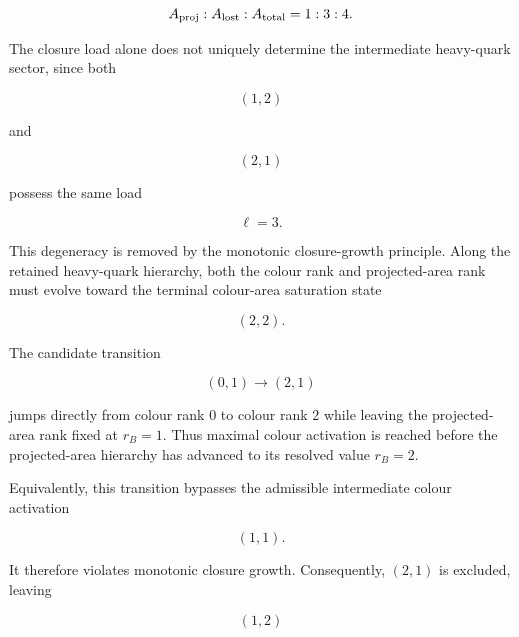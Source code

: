 \documentclass[11pt]{article}
\theoremstyle{definition}
\theoremstyle{remark}
\begin{document}
\begin{equation}
A_{\rm proj}:A_{\rm lost}:A_{\rm total}
=
1:3:4.
\end{equation}









The closure load alone does not uniquely determine the
intermediate heavy-quark sector, since both

\begin{equation}
(1,2)
\end{equation}

and

\begin{equation}
(2,1)
\end{equation}

possess the same load

\begin{equation}
\ell=3.
\end{equation}

This degeneracy is removed by the monotonic closure-growth
principle. Along the retained heavy-quark hierarchy, both the
colour rank and projected-area rank must evolve toward the
terminal colour-area saturation state

\begin{equation}
(2,2).
\end{equation}

The candidate transition

\begin{equation}
(0,1)\longrightarrow(2,1)
\end{equation}

jumps directly from colour rank \(0\) to colour rank \(2\)
while leaving the projected-area rank fixed at \(r_B=1\).
Thus maximal colour activation is reached before the
projected-area hierarchy has advanced to its resolved value
\(r_B=2\).

Equivalently, this transition bypasses the admissible
intermediate colour activation

\begin{equation}
(1,1).
\end{equation}

It therefore violates monotonic closure growth. Consequently,
\((2,1)\) is excluded, leaving

\begin{equation}
(1,2)
\end{equation}
\end{document}
